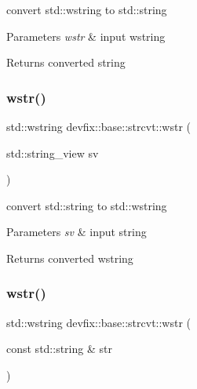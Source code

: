 convert std\+::wstring to std\+::string 


\begin{DoxyParams}{Parameters}
{\em wstr} & input wstring \\
\hline
\end{DoxyParams}
\begin{DoxyReturn}{Returns}
converted string 
\end{DoxyReturn}
\mbox{\label{structdevfix_1_1base_1_1strcvt_aa7148029839299a29e74e422fdb48567}} 
\subsubsection{\texorpdfstring{wstr()}{wstr()}\hspace{0.1cm}{\footnotesize\ttfamily [1/2]}}
{\footnotesize\ttfamily std\+::wstring devfix\+::base\+::strcvt\+::wstr (\begin{DoxyParamCaption}\item[{std\+::string\+\_\+view}]{sv }\end{DoxyParamCaption})\hspace{0.3cm}{\ttfamily [static]}}



convert std\+::string to std\+::wstring 


\begin{DoxyParams}{Parameters}
{\em sv} & input string \\
\hline
\end{DoxyParams}
\begin{DoxyReturn}{Returns}
converted wstring 
\end{DoxyReturn}
\mbox{\label{structdevfix_1_1base_1_1strcvt_acc5ba74410abd732c4559800b1ff2852}} 
\subsubsection{\texorpdfstring{wstr()}{wstr()}\hspace{0.1cm}{\footnotesize\ttfamily [2/2]}}
{\footnotesize\ttfamily std\+::wstring devfix\+::base\+::strcvt\+::wstr (\begin{DoxyParamCaption}\item[{const std\+::string \&}]{str }\end{DoxyParamCaption})\hspace{0.3cm}{\ttfamily [static]}}



